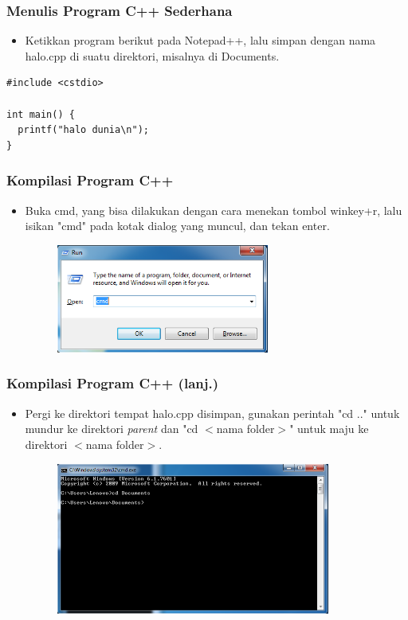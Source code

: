 \begin{frame}[fragile]
\frametitle{Menulis Program C++ Sederhana}
\begin{itemize}
  \item Ketikkan program berikut pada Notepad++, lalu simpan dengan nama halo.cpp di suatu direktori, misalnya di Documents.
\end{itemize}
\begin{lstlisting}
#include <cstdio>

int main() {
  printf("halo dunia\n");
}
\end{lstlisting}
\end{frame}

\begin{frame}
\frametitle{Kompilasi Program C++}
\begin{itemize}
  \item Buka cmd, yang bisa dilakukan dengan cara menekan tombol winkey+r, lalu isikan "cmd" pada kotak dialog yang muncul, dan tekan enter.
  \begin{figure}
    \includegraphics[width=7cm]{asset/run.png}
  \end{figure}
\end{itemize}
\end{frame}

\begin{frame}
\frametitle{Kompilasi Program C++ (lanj.)}
\begin{itemize}
  \item Pergi ke direktori tempat halo.cpp disimpan, gunakan perintah "cd .." untuk mundur ke direktori \textit{parent} dan "cd $<$nama folder$>$" untuk maju ke direktori $<$nama folder$>$.
  \begin{figure}
    \includegraphics[width=9cm]{asset/cmd-1.png}
  \end{figure}
\end{itemize}
\end{frame}

